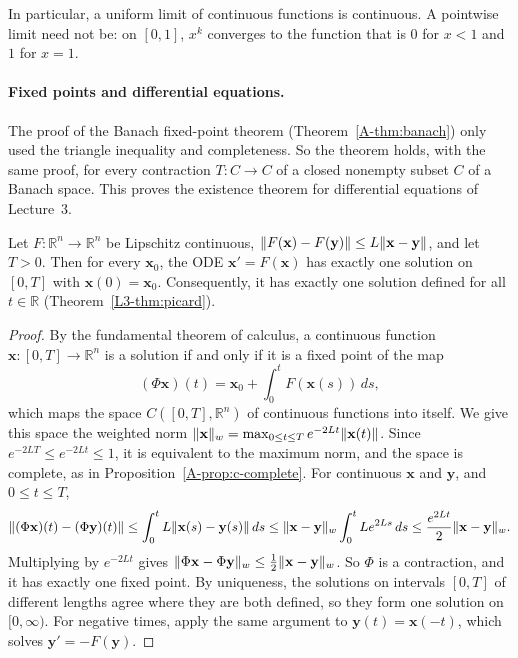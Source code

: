 In particular, a uniform limit of continuous functions is continuous. A pointwise limit need not be: on $[0, 1]$, $x^k$ converges to the function that is $0$ for $x < 1$ and $1$ for $x = 1$.

\paragraph{Fixed points and differential equations.} The proof of the Banach fixed-point theorem (Theorem~\ref{A-thm:banach}) only used the triangle inequality and completeness. So the theorem holds, with the same proof, for every contraction $T: C \to C$ of a closed nonempty subset $C$ of a Banach space. This proves the existence theorem for differential equations of Lecture~3.

\begin{theorem}\label{A-thm:picard-lindelof}
    Let $F: \mathbb{R}^n \to \mathbb{R}^n$ be Lipschitz continuous, $\lVert F(\mathbf{x}) - F(\mathbf{y}) \rVert \leq L\lVert \mathbf{x} - \mathbf{y} \rVert$, and let $T > 0$. Then for every $\mathbf{x}_0$, the ODE $\mathbf{x}' = F(\mathbf{x})$ has exactly one solution on $[0, T]$ with $\mathbf{x}(0) = \mathbf{x}_0$. Consequently, it has exactly one solution defined for all $t \in \mathbb{R}$ (Theorem~\ref{L3-thm:picard}).
\end{theorem}

\begin{proof}
    By the fundamental theorem of calculus, a continuous function $\mathbf{x}: [0, T] \to \mathbb{R}^n$ is a solution if and only if it is a fixed point of the map
    \[(\Phi\mathbf{x})(t) = \mathbf{x}_0 + \int_0^t F(\mathbf{x}(s))\, ds,\]
    which maps the space $C([0, T], \mathbb{R}^n)$ of continuous functions into itself. We give this space the weighted norm $\lVert \mathbf{x} \rVert_w = \max_{0 \leq t \leq T} e^{-2Lt}\lVert \mathbf{x}(t) \rVert$. Since $e^{-2LT} \leq e^{-2Lt} \leq 1$, it is equivalent to the maximum norm, and the space is complete, as in Proposition~\ref{A-prop:c-complete}. For continuous $\mathbf{x}$ and $\mathbf{y}$, and $0 \leq t \leq T$,
    \[\lVert (\Phi\mathbf{x})(t) - (\Phi\mathbf{y})(t) \rVert \leq \int_0^t L\lVert \mathbf{x}(s) - \mathbf{y}(s) \rVert\, ds \leq \lVert \mathbf{x} - \mathbf{y} \rVert_w\int_0^t Le^{2Ls}\, ds \leq \frac{e^{2Lt}}{2}\lVert \mathbf{x} - \mathbf{y} \rVert_w.\]
    Multiplying by $e^{-2Lt}$ gives $\lVert \Phi\mathbf{x} - \Phi\mathbf{y} \rVert_w \leq \frac{1}{2}\lVert \mathbf{x} - \mathbf{y} \rVert_w$. So $\Phi$ is a contraction, and it has exactly one fixed point. By uniqueness, the solutions on intervals $[0, T]$ of different lengths agree where they are both defined, so they form one solution on $[0, \infty)$. For negative times, apply the same argument to $\mathbf{y}(t) = \mathbf{x}(-t)$, which solves $\mathbf{y}' = -F(\mathbf{y})$.
\end{proof}

